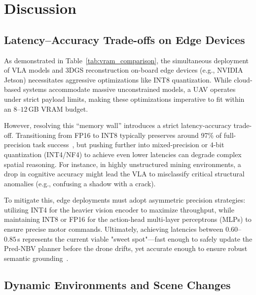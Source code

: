 \documentclass[conference]{IEEEtran}
\begin{document}
\section{Discussion}
\label{sec:discussion}

\subsection{Latency--Accuracy Trade-offs on Edge Devices}
\label{subsec:disc_latency}

As demonstrated in Table~\ref{tab:vram_comparison}, the simultaneous deployment of VLA models and 3DGS reconstruction on-board edge devices (e.g., NVIDIA Jetson) necessitates aggressive optimizations like INT8 quantization. While cloud-based systems accommodate massive unconstrained models, a UAV operates under strict payload limits, making these optimizations imperative to fit within an $8$--$12$\,GB VRAM budget.

However, resolving this ``memory wall'' introduces a strict latency-accuracy trade-off. Transitioning from FP16 to INT8 typically preserves around 97\% of full-precision task success~\cite{vla_concepts_2024}, but pushing further into mixed-precision or 4-bit quantization (INT4/NF4) to achieve even lower latencies can degrade complex spatial reasoning. For instance, in highly unstructured mining environments, a drop in cognitive accuracy might lead the VLA to misclassify critical structural anomalies (e.g., confusing a shadow with a crack). 

To mitigate this, edge deployments must adopt asymmetric precision strategies: utilizing INT4 for the heavier vision encoder to maximize throughput, while maintaining INT8 or FP16 for the action-head multi-layer perceptrons (MLPs) to ensure precise motor commands. Ultimately, achieving latencies between $0.60$--$0.85$\,s represents the current viable "sweet spot"—fast enough to safely update the Pred-NBV planner before the drone drifts, yet accurate enough to ensure robust semantic grounding~\cite{zhang2025autonomous}.

\subsection{Dynamic Environments and Scene Changes}
\label{subsec:disc_dynamic}
\end{document}
